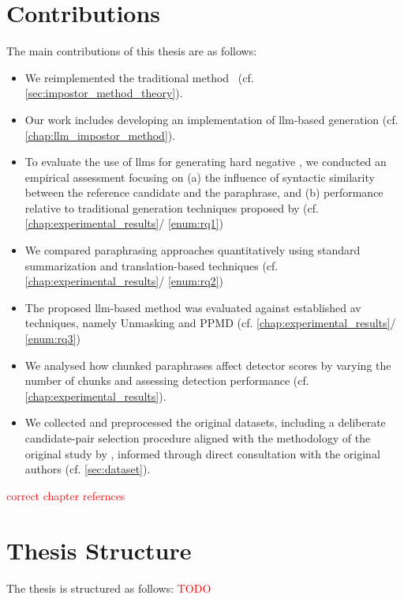 


\section{Contributions}
\label{sec:contributions}
The main contributions of this thesis are as follows:
\begin{itemize}
    \item We reimplemented the traditional \imp{} method~\citep{koppel_determining_2014} (cf. \autoref{sec:impostor_method_theory}).
    \item Our work includes developing an implementation of \ac{llm}-based \imp{} generation (cf. \autoref{chap:llm_impostor_method}). 
    \item To evaluate the use of \acp{llm} for generating hard negative \imps{}, we conducted an empirical assessment focusing on (a) the influence of syntactic similarity between the reference candidate and the paraphrase, and (b) performance relative to traditional \imp{} generation techniques proposed by \citet{koppel_determining_2014} (cf. \autoref{chap:experimental_results}/ \ref{enum:rq1})
    \item We compared paraphrasing approaches quantitatively using standard summarization and translation-based techniques (cf. \autoref{chap:experimental_results}/ \ref{enum:rq2})
    \item The proposed \ac{llm}-based \imp{} method was evaluated against established \ac{av} techniques, namely Unmasking and PPMD (cf. \autoref{chap:experimental_results}/ \ref{enum:rq3})
    \item We analysed how chunked paraphrases affect detector scores by varying the number of chunks and assessing detection performance (cf. \autoref{chap:experimental_results}).
    \item We collected and preprocessed the original datasets, including a deliberate candidate-pair selection procedure aligned with the methodology of the original study by \citet{koppel_determining_2014}, informed through direct consultation with the original authors (cf. \autoref{sec:dataset}).
\end{itemize}

\textcolor{red}{correct chapter refernces}


\section{Thesis Structure}
\label{sec:thesis_structure}
The thesis is structured as follows:
\textcolor{red}{TODO}